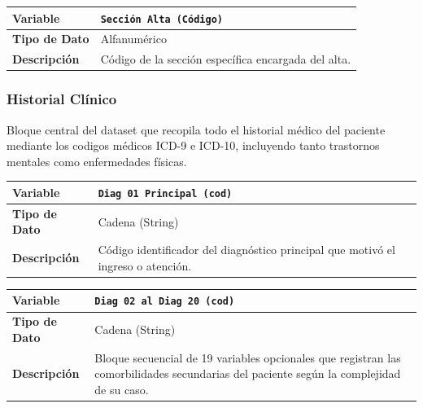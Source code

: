 \documentclass[12pt,a4paper,onecolumn,oneside]{report}
\begin{document}
\noindent
\begin{tabular}{|p{3.5cm}|p{10.5cm}|}
\hline
\rowcolor[RGB]{239,239,239} 
\textbf{Variable} & \textbf{\texttt{Sección Alta (Código)}} \\ \hline
\textbf{Tipo de Dato} & Alfanumérico \\ \hline
\textbf{Descripción} & Código de la sección específica encargada del alta. \\ \hline
\end{tabular}
\label{tab:var_seccion_alta}
\vspace{0.6cm}

\subsubsection{Historial Clínico}
Bloque central del dataset que recopila todo el historial médico del paciente mediante los codigos médicos ICD-9 e ICD-10, incluyendo tanto trastornos mentales como enfermedades físicas.

\vspace{0.3cm}
\noindent
\begin{tabular}{|p{3.5cm}|p{10.5cm}|}
\hline
\rowcolor[RGB]{239,239,239} 
\textbf{Variable} & \textbf{\texttt{Diag 01 Principal (cod)}} \\ \hline
\textbf{Tipo de Dato} & Cadena (String) \\ \hline
\textbf{Descripción} & Código identificador del diagnóstico principal que motivó el ingreso o atención. \\ \hline
\end{tabular}
\label{tab:var_diag_principal}
\vspace{0.4cm}

\noindent
\begin{tabular}{|p{3.5cm}|p{10.5cm}|}
\hline
\rowcolor[RGB]{239,239,239} 
\textbf{Variable} & \textbf{\texttt{Diag 02 al Diag 20 (cod)}} \\ \hline
\textbf{Tipo de Dato} & Cadena (String) \\ \hline
\textbf{Descripción} & Bloque secuencial de 19 variables opcionales que registran las comorbilidades secundarias del paciente según la complejidad de su caso. \\ \hline
\end{tabular}
\label{tab:var_conjunto_secundariop}
\vspace{0.4cm}
\end{document}
